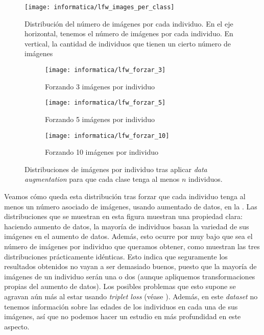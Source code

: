 \begin{figure}[!hbtp]
    \centering
    \texttt{[image: informatica/lfw\_images\_per\_class]}
    \caption{Distribución del número de imágenes por cada individuo. En el eje horizontal, tenemos el número de imágenes por cada individuo. En vertical, la cantidad de individuos que tienen un cierto número de imágenes}
    \label{img:ejemplo_cacd}
\end{figure}

\begin{figure}[hbtp!]
\centering
    \begin{subfigure}{0.5\textwidth}
        \centering
        \texttt{[image: informatica/lfw\_forzar\_3]}
        \caption{Forzando 3 imágenes por individuo }
    \end{subfigure}%
    \begin{subfigure}{.5\textwidth}
        \centering
        \texttt{[image: informatica/lfw\_forzar\_5]}
        \caption{Forzando 5 imágenes por individuo}
    \end{subfigure}

    \begin{subfigure}{.5\textwidth}
        \centering
        \texttt{[image: informatica/lfw\_forzar\_10]}
        \caption{Forzando 10 imágenes por individuo }
    \end{subfigure}

    \caption{Distribuciones de imágenes por individuo tras aplicar \textit{data augmentation} para que cada clase tenga al menos $n$ individuos.}
    \label{img:distribuciones_forzar_data_augmentation}
\end{figure}

Veamos cómo queda esta distribución tras forzar que cada individuo tenga al menos un número asociado de imágenes, usando aumentado de datos, en la . Las distribuciones que se muestran en esta figura muestran una propiedad clara: haciendo aumento de datos, la mayoría de individuos basan la variedad de sus imágenes en el aumento de datos. Además, esto ocurre por muy bajo que sea el número de imágenes por individuo que queramos obtener, como muestran las tres distribuciones prácticamente idénticas. Esto indica que seguramente los resultados obtenidos no vayan a ser demasiado buenos, puesto que la mayoría de imágenes de un individuo serán una o dos  (aunque apliquemos transformaciones propias del aumento de datos). Los posibles problemas que esto supone se agravan aún más al estar usando \textit{triplet loss} (véase ). Además, en este \textit{dataset} no tenemos información sobre las edades de los individuos en cada una de sus imágenes, así que no podemos hacer un estudio en más profundidad en este aspecto.

